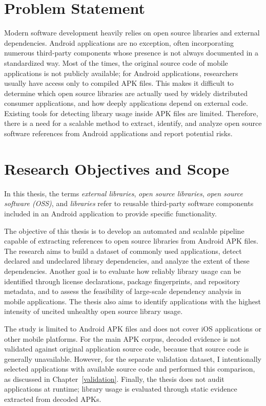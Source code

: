 \documentclass[12pt,a4paper]{report}
\begin{document}
\section{Problem Statement}
Modern software development heavily relies on open source libraries and external dependencies. Android applications are no exception, often incorporating numerous third-party components whose presence is not always documented in a standardized way. Most of the times, the original source code of mobile applications is not publicly available; for Android applications, researchers usually have access only to compiled APK files. This makes it difficult to determine which open source libraries are actually used by widely distributed consumer applications, and how deeply applications depend on external code.
Existing tools for detecting library usage inside APK files are limited. Therefore, there is a need for a scalable method to extract, identify, and analyze open source software references from Android applications and report potential risks.

\section{Research Objectives and Scope}
In this thesis, the terms \emph{external libraries}, \emph{open source libraries}, \emph{open source software (OSS)}, and \emph{libraries} refer to reusable third-party software components included in an Android application to provide specific functionality.

The objective of this thesis is to develop an automated and scalable pipeline capable of extracting references to open source libraries from Android APK files. The research aims to build a dataset of commonly used applications, detect declared and undeclared library dependencies, and analyze the extent of these dependencies. Another goal is to evaluate how reliably library usage can be identified through license declarations, package fingerprints, and repository metadata, and to assess the feasibility of large-scale dependency analysis in mobile applications. The thesis also aims to identify applications with the highest intensity of uncited unhealthy open source library usage.

The study is limited to Android APK files and does not cover iOS applications or other mobile platforms. For the main APK corpus, decoded evidence is not validated against original application source code, because that source code is generally unavailable. However, for the separate validation dataset, I intentionally selected applications with available source code and performed this comparison, as discussed in Chapter~\ref{validation}. Finally, the thesis does not audit applications at runtime; library usage is evaluated through static evidence extracted from decoded APKs.
\end{document}
